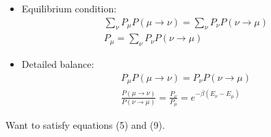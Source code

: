 \documentclass[10pt]{beamer}
\begin{document}
\begin{frame}
\begin{itemize}
\item \small Equilibrium condition: \\
\begin{gather}
\sum\limits_{\nu} P_\mu P(\mu \rightarrow \nu) = \sum\limits_{\nu} P_\nu P(\nu \rightarrow \mu)  \\
P_\mu  = \sum\limits_{\nu} P_\nu P(\nu \rightarrow \mu)
\end{gather}
\item \small Detailed balance: \\
\begin{gather}
 P_\mu P(\mu \rightarrow \nu) = P_\nu P(\nu \rightarrow \mu) \\
\frac{P(\mu \rightarrow \nu)}{P(\nu \rightarrow \mu)} = \frac{P_\nu }{P_\mu } = e^ {-\beta (E_\nu - E_\mu)}
\end{gather}
\end{itemize}
Want to satisfy equations (5) and (9). \\
\end{frame}
\end{document}
